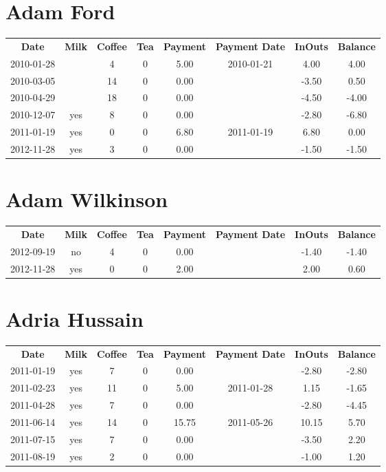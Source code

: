 \section{Adam Ford}

\begin{center}
\begin{tabular}{cccccccc}
\textbf{Date} & \textbf{Milk} & \textbf{Coffee} & \textbf{Tea} & \textbf{Payment} & \textbf{Payment Date} & \textbf{InOuts} & \textbf{Balance} \\
2010-01-28 &  &  4 & 0 & 5.00 & 2010-01-21 &  4.00 &  4.00\\ 
2010-03-05 &  & 14 & 0 & 0.00 &  & -3.50 &  0.50\\ 
2010-04-29 &  & 18 & 0 & 0.00 &  & -4.50 & -4.00\\ 
2010-12-07 & yes &  8 & 0 & 0.00 &  & -2.80 & -6.80\\ 
2011-01-19 & yes &  0 & 0 & 6.80 & 2011-01-19 &  6.80 &  0.00\\ 
2012-11-28 & yes &  3 & 0 & 0.00 &  & -1.50 & -1.50
\end{tabular}
\end{center}

\section{Adam Wilkinson}

\begin{center}
\begin{tabular}{cccccccc}
\textbf{Date} & \textbf{Milk} & \textbf{Coffee} & \textbf{Tea} & \textbf{Payment} & \textbf{Payment Date} & \textbf{InOuts} & \textbf{Balance} \\
2012-09-19 & no & 4 & 0 & 0.00 &  & -1.40 & -1.40\\ 
2012-11-28 & yes & 0 & 0 & 2.00 &  &  2.00 &  0.60
\end{tabular}
\end{center}

\section{Adria Hussain}

\begin{center}
\begin{tabular}{cccccccc}
\textbf{Date} & \textbf{Milk} & \textbf{Coffee} & \textbf{Tea} & \textbf{Payment} & \textbf{Payment Date} & \textbf{InOuts} & \textbf{Balance} \\
2011-01-19 & yes &  7 & 0 &  0.00 &  & -2.80 & -2.80\\ 
2011-02-23 & yes & 11 & 0 &  5.00 & 2011-01-28 &  1.15 & -1.65\\ 
2011-04-28 & yes &  7 & 0 &  0.00 &  & -2.80 & -4.45\\ 
2011-06-14 & yes & 14 & 0 & 15.75 & 2011-05-26 & 10.15 &  5.70\\ 
2011-07-15 & yes &  7 & 0 &  0.00 &  & -3.50 &  2.20\\ 
2011-08-19 & yes &  2 & 0 &  0.00 &  & -1.00 &  1.20
\end{tabular}
\end{center}

